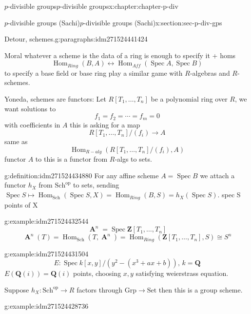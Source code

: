 \documentclass[oneside,10pt,]{book}
\numberwithin{equation}{section}
\newcommand{\lb}{[}
\newcommand{\rb}{]}
\newcommand{\ZZ}{\mathbf{Z}}
\newcommand{\QQ}{\mathbf{Q}}
\newcommand{\op}{\mathrm{op}}
\DeclareMathOperator{\Hom}{Hom}
\DeclareMathOperator{\Spec}{Spec}
\DeclareMathOperator{\aff}{\mathbf{A}}
\begin{document}
\begin{chapterptx}{\(p\)-divisible groups}{}{\(p\)-divisible groups}{}{}{x:chapter:chapter-p-div}
\begin{sectionptx}{\(p\)-divisible groups (Sachi)}{}{\(p\)-divisible groups (Sachi)}{}{}{x:section:sec-p-div-gps}
\begin{paragraphs}{Detour, schemes.}{g:paragraphs:idm271524441424}
%
\par
Moral whatever  a scheme is the data of a ring is enough to specify it + homs%
\begin{equation*}
\Hom_{Ring} (B,A) \leftrightarrow \Hom_{Aff}(\Spec A, \Spec B)
\end{equation*}
to specify a base field or base ring play a similar game with \(R\)-algebras and \(R\)-schemes.%
\par
Yoneda, schemes are functors: Let \(R\lb T_1,\ldots,T_n\rb \) be a polynomial ring over \(R\), we want solutions to%
\begin{equation*}
f_1=  f_2 = \cdots = f_m = 0
\end{equation*}
with coefficients in \(A\) this is asking for  a map%
\begin{equation*}
R\lb T_1, \ldots ,T_n] /(f_i) \to A
\end{equation*}
same as%
\begin{equation*}
\Hom_{R-alg} (R[T_1,\ldots, T_n] /(f_i), A)
\end{equation*}
functor \(A\) to this is a functor from \(R\)-algs to sets.%
\begin{definition}{}{g:definition:idm271524434880}%
For any affine scheme \(A = \Spec B\) we attach a functor \(h_X\) from \(\mathrm{Sch}^\op\) to sets, sending \(\Spec S \mapsto \Hom_{\mathrm{Sch}} (\Spec S, X) = \Hom_{Ring} (B,S) = h_X(\Spec S)\). spec S points of X%
\end{definition}
\begin{example}{}{g:example:idm271524432544}%
%
\begin{equation*}
\aff^n = \Spec \ZZ \lb T_1,\ldots, T_n\rb
\end{equation*}
%
\begin{equation*}
\aff^n(T) = \Hom_{\mathrm{Sch}} (T, \aff^n) = \Hom_{Ring}(\ZZ[T_1,\ldots, T_n], S)\cong S^n
\end{equation*}
%
\end{example}
\begin{example}{}{g:example:idm271524431504}%
%
\begin{equation*}
E \colon \Spec k[x,y] / (y^2 - (x^3 + ax +b)),\,k = \QQ
\end{equation*}
\(E(\QQ(i)) = \QQ(i)\) points, choosing \(x,y\) satisfying weierstrass equation.%
\end{example}
Suppose \(h_X \colon \mathrm{Sch}^\op \to R\) factors through \(\mathrm{Grp} \to \mathrm{Set}\) then this is a group scheme.%
\begin{example}{}{g:example:idm271524428736}%

\end{example}
\end{paragraphs}
\end{sectionptx}
\end{chapterptx}
\end{document}
